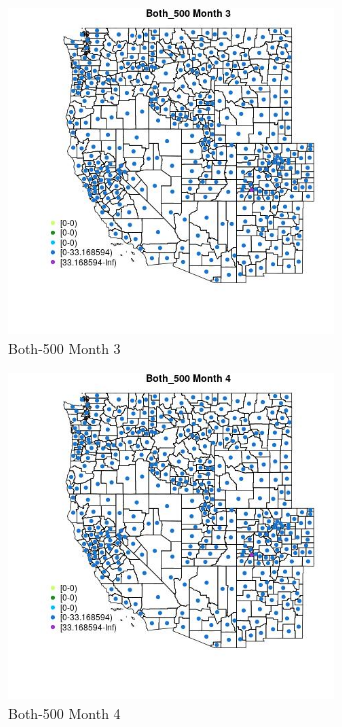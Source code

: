 \begin{figure} 
\centering  
\includegraphics[width=0.77\textwidth]{Code_Outputs/df_report_ML_predictors_CountyCentroid_Locations_Dates_2008-01-01to2018-12-31_MapObsMo3Both_500.jpg} 
\caption{\label{fig:df_report_ML_predictors_CountyCentroid_Locations_Dates_2008-01-01to2018-12-31MapObsMo3Both_500}Both-500 Month 3} 
\end{figure} 
 

\begin{figure} 
\centering  
\includegraphics[width=0.77\textwidth]{Code_Outputs/df_report_ML_predictors_CountyCentroid_Locations_Dates_2008-01-01to2018-12-31_MapObsMo4Both_500.jpg} 
\caption{\label{fig:df_report_ML_predictors_CountyCentroid_Locations_Dates_2008-01-01to2018-12-31MapObsMo4Both_500}Both-500 Month 4} 
\end{figure} 
 

